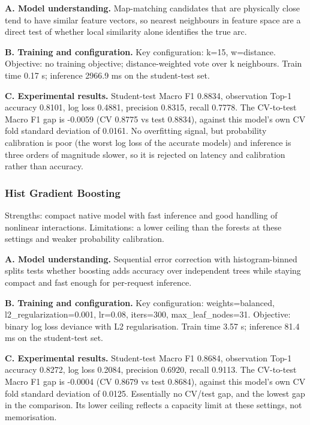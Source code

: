 \documentclass[11pt,a4paper]{article}
\begin{document}
\noindent\textbf{A. Model understanding.} Map-matching candidates that are physically close tend to have similar feature vectors, so nearest neighbours in feature space are a direct test of whether local similarity alone identifies the true arc.

\noindent\textbf{B. Training and configuration.} Key configuration: k=15, w=distance. Objective: no training objective; distance-weighted vote over k neighbours. Train time 0.17 s; inference 2966.9 ms on the student-test set.

\noindent\textbf{C. Experimental results.} Student-test Macro F1 0.8834, observation Top-1 accuracy 0.8101, log loss 0.4881, precision 0.8315, recall 0.7778. The CV-to-test Macro F1 gap is -0.0059 (CV 0.8775 vs test 0.8834), against this model's own CV fold standard deviation of 0.0161. No overfitting signal, but probability calibration is poor (the worst log loss of the accurate models) and inference is three orders of magnitude slower, so it is rejected on latency and calibration rather than accuracy.

\subsubsection{Hist Gradient Boosting}

Strengths: compact native model with fast inference and good handling of nonlinear interactions. Limitations: a lower ceiling than the forests at these settings and weaker probability calibration.

\noindent\textbf{A. Model understanding.} Sequential error correction with histogram-binned splits tests whether boosting adds accuracy over independent trees while staying compact and fast enough for per-request inference.

\noindent\textbf{B. Training and configuration.} Key configuration: weights=balanced, l2\_regularization=0.001, lr=0.08, iters=300, max\_leaf\_nodes=31. Objective: binary log loss deviance with L2 regularisation. Train time 3.57 s; inference 81.4 ms on the student-test set.

\noindent\textbf{C. Experimental results.} Student-test Macro F1 0.8684, observation Top-1 accuracy 0.8272, log loss 0.2084, precision 0.6920, recall 0.9113. The CV-to-test Macro F1 gap is -0.0004 (CV 0.8679 vs test 0.8684), against this model's own CV fold standard deviation of 0.0125. Essentially no CV/test gap, and the lowest gap in the comparison. Its lower ceiling reflects a capacity limit at these settings, not memorisation.
\end{document}
